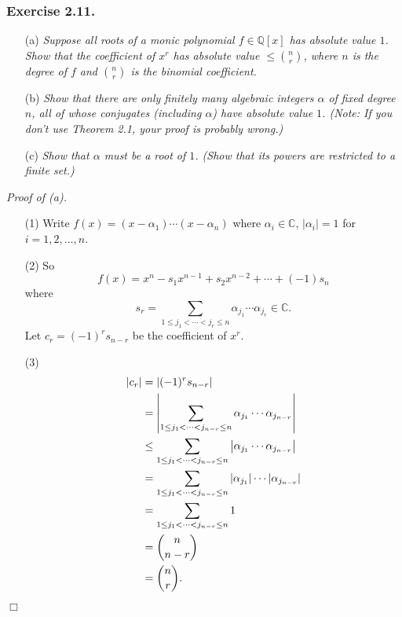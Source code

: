 \documentclass{article}
\begin{document}
\subsubsection*{Exercise 2.11.}
\begin{enumerate}
\item[(a)]
\emph{Suppose all roots of a monic polynomial $f \in \mathbb{Q}[x]$
has absolute value $1$.
Show that the coefficient of $x^r$ has absolute value $\leq {n \choose r}$,
where $n$ is the degree of $f$ and ${n \choose r}$ is the binomial coefficient.}
\item[(b)]
\emph{Show that there are only finitely many algebraic integers $\alpha$
of fixed degree $n$, all of whose conjugates (including $\alpha$) have absolute value $1$.
(Note: If you don't use Theorem 2.1, your proof is probably wrong.)}
\item[(c)]
\emph{Show that $\alpha$ must be a root of $1$.
(Show that its powers are restricted to a finite set.)} \\
\end{enumerate}

\emph{Proof of (a).}
\begin{enumerate}
\item[(1)]
Write
$f(x) = (x-\alpha_1) \cdots (x-\alpha_n)$ where $\alpha_i \in \mathbb{C}$, $|\alpha_i| = 1$
for $i = 1, 2, \ldots, n$.
\item[(2)]
So $$f(x) = x^n - s_1 x^{n-1} + s_2 x^{n-2} + \cdots + (-1)s_n$$
where
$$s_r = \sum_{1 \leq j_1 < \cdots < j_r \leq n} \alpha_{j_1} \cdots \alpha_{j_r} \in \mathbb{C}.$$
Let $c_r = (-1)^r s_{n-r}$ be the coefficient of $x^r$.
\item[(3)]
\begin{align*}
|c_r|
&= |(-1)^r s_{n-r}| \\
&= \abs{\sum_{1 \leq j_1 < \cdots < j_{n-r} \leq n} \alpha_{j_1} \cdots \alpha_{j_{n-r}}} \\
&\leq \sum_{1 \leq j_1 < \cdots < j_{n-r} \leq n} \abs{\alpha_{j_1} \cdots \alpha_{j_{n-r}}} \\
&= \sum_{1 \leq j_1 < \cdots < j_{n-r} \leq n} |\alpha_{j_1}| \cdots |\alpha_{j_{n-r}}| \\
&= \sum_{1 \leq j_1 < \cdots < j_{n-r} \leq n} 1 \\
&= {n \choose n-r} \\
&= {n \choose r}.
\end{align*}
\end{enumerate}
$\Box$ \\
\end{document}
